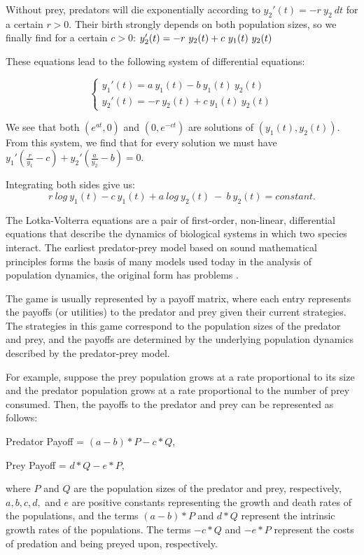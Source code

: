 Without prey, predators will die exponentially according to \(y_2'(t)=-r\ y_2\ dt\) for a certain \(r>0\). Their birth strongly depends on both population sizes, so we finally find for a certain \(c>0\):
\( \\ y_2'(t) = -r\ y_2(t) + c\ y_1(t)\ y_2(t)  \)

These equations lead to the following system of differential equations:  

$$ \left\{
\begin{array}{lr}
y_1'(t) = a\ y_1(t) - b\ y_1(t)\ y_2(t)\\
y_2'(t) = -r\ y_2(t) + c\ y_1(t)\ y_2(t)
\end{array}
\right. $$
\newline
 
We see that both \(( e^{at}, 0)\) and \((0, e^{-ct} )\) are solutions of \((y_1(t), y_2(t))\). From this system, we find that for every solution we must have 
\(y_1' (\frac{r}{y_1} - c) +y_2' (\frac{a}{y_2} - b) = 0 \).

Integrating both sides give us: 
\[r\ log\ y_1(t) -   c\ y_1(t)  +  a\ log\ y_2(t)\ - \ b\ y_2(t) = constant. \]

The Lotka-Volterra equations are a pair of first-order, non-linear, differential equations that describe the dynamics of biological systems in which two species interact. The earliest predator-prey model based on sound mathematical principles forms the basis of many models used today in the analysis of population dynamics, the original form has problems \cite{cpp1}.

The game is usually represented by a payoff matrix, where each entry represents the payoffs (or utilities) to the predator and prey given their current strategies. The strategies in this game correspond to the population sizes of the predator and prey, and the payoffs are determined by the underlying population dynamics described by the predator-prey model.

For example, suppose the prey population grows at a rate proportional to its size and the predator population grows at a rate proportional to the number of prey consumed. Then, the payoffs to the predator and prey can be represented as follows:


Predator Payoff = \((a - b) * P - c * Q\),

Prey Payoff = \(d * Q - e * P\),


where \(P\) and \(Q\) are the population sizes of the predator and prey, respectively, \(a, b, c, d,\) and \(e\) are positive constants representing the growth and death rates of the populations, and the terms \((a - b) * P\) and \(d * Q\) represent the intrinsic growth rates of the populations. The terms \(-c * Q\) and \(-e * P\) represent the costs of predation and being preyed upon, respectively.

